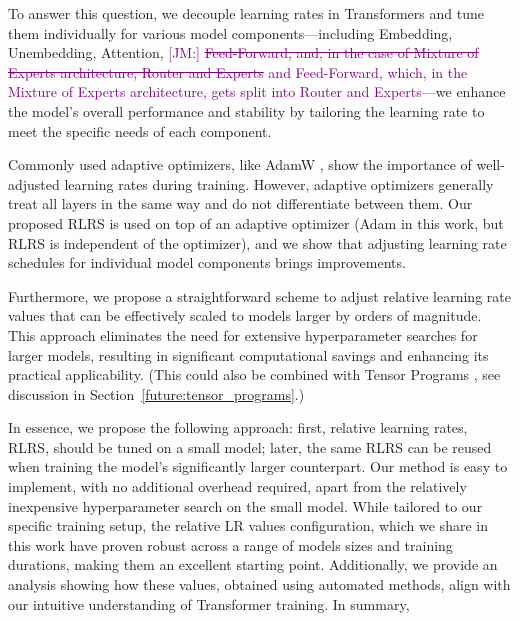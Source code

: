 \documentclass{article} %
\newcommand{\jmr}[2]{\textcolor{purple}{[JM:] \sout{#1} #2}}
\begin{document}
    To answer this question, we decouple learning rates in Transformers and tune them individually for various model components—including Embedding, Unembedding, Attention, \jmr{Feed-Forward, and, in the case of Mixture of Experts architecture, Router and Experts}{and Feed-Forward, which, in the Mixture of Experts architecture, gets split into Router and Experts}—we enhance the model's overall performance and stability by tailoring the learning rate to meet the specific needs of each component. 

    Commonly used adaptive optimizers, like AdamW \citep{loshchilov2019decoupled}, show the importance of well-adjusted learning rates during training. However, adaptive optimizers generally treat all layers in the same way and do not differentiate between them. Our proposed RLRS is used on top of an adaptive optimizer (Adam in this work, but RLRS is independent of the optimizer), and we show that adjusting learning rate schedules for individual model components brings improvements.

    Furthermore, we propose a straightforward scheme to adjust relative learning rate values that can be effectively scaled to models larger by orders of magnitude. This approach eliminates the need for extensive hyperparameter searches for larger models, resulting in significant computational savings and enhancing its practical applicability. (This could also be combined with Tensor Programs \citep{yang2022tensor}, see discussion in Section~\ref{future:tensor_programs}.)%

    In essence, we propose the following approach: first, relative learning rates, RLRS, should be tuned on a small model; later, the same RLRS can be reused when training the model's significantly larger counterpart.
    Our method is easy to implement, with no additional overhead required, apart from the relatively inexpensive hyperparameter search on the small model. While tailored to our specific training setup, the relative LR values configuration, which we share in this work have proven robust across a range of models sizes and training durations, making them an excellent starting point. 
    Additionally, we provide an analysis showing how these values, obtained using automated methods, align with our intuitive understanding of Transformer training. In summary,
\end{document}

